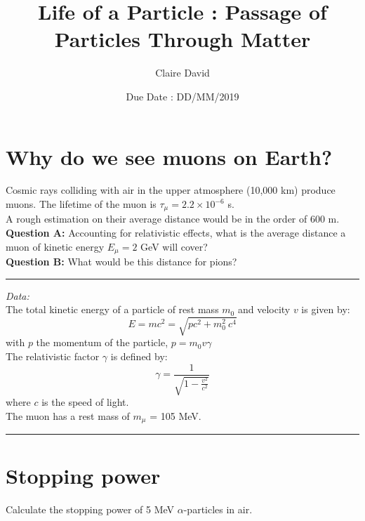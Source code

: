 \documentclass[12pt]{article}
\title{Life of a Particle : Passage of Particles Through Matter}
\author{Claire David}
\date{Due Date : DD/MM/2019}
\begin{document}
\maketitle


\section{Why do we see muons on Earth?}

Cosmic rays colliding with air in the upper atmosphere (10,000 km) produce muons. The lifetime of the muon is $\tau_\mu = 2.2 \times 10^{-6}$ s.\\
A rough estimation on their average distance would be in the order of 600 m.\\

\textbf{Question A:} Accounting for relativistic effects, what is the average distance a muon of kinetic energy $E_\mu = 2$ GeV will cover?\\

\textbf{Question B:} What would be this distance for pions?\\


\vspace{4ex}
\hrule
\vspace{4ex}
\textit{Data:}\\


The total kinetic energy of a particle of rest mass $m_0$ and velocity $v$ is given by:
\begin{equation}
 E = mc^2 = \sqrt{pc^2 + m_0^2 \: c^4}
\end{equation}
with $p$ the momentum of the particle, $p= m_0 v \gamma$\\

The relativistic factor $\gamma$ is defined by:
\begin{equation}
 \gamma = \frac{1}{\sqrt{1 - \frac{v^2}{c^2}}}
\end{equation}
where $c$ is the speed of light.\\

The muon has a rest mass of $m_\mu$ = 105 MeV.

\vspace{4ex}
\hrule
\vspace{4ex}


\section{Stopping power}

Calculate the stopping power of 5 MeV $\alpha$-particles in air.
\end{document}
